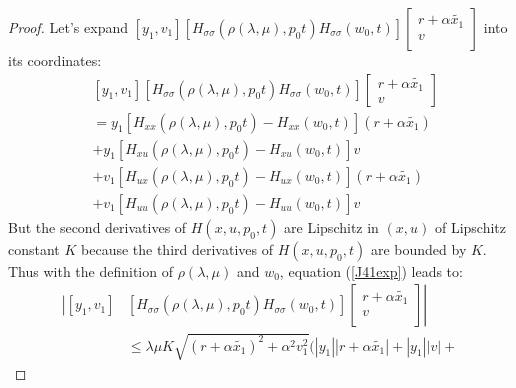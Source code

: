\documentclass[a4paper,10pt]{article}
\begin{document}
\begin{proof}
    Let's expand $\left[y_{1},v_{1}\right]
	[H_{\sigma \sigma}(\rho(\lambda,\mu),p_{0}t)H_{\sigma \sigma}(w_{0},t)]
            \left[
        \begin{array}
        {c}
            r+\alpha\tilde{x_{1}}  \\
            v  \\
        \end{array}
        \right]$ 
	into its coordinates:
	\begin{equation}
		\begin{split}
	    & \left[y_{1},v_{1}\right]
	[H_{\sigma \sigma}(\rho(\lambda,\mu),p_{0}t)H_{\sigma \sigma}(w_{0},t)]
        \left[
        \begin{array}
        {c}
            r+\alpha\tilde{x_{1}}  \\
            v  
        \end{array}
        \right] \\ & =  
	y_{1}[H_{xx}(\rho(\lambda,\mu),p_{0}t)-H_{xx}(w_{0},t)](r+\alpha\tilde{x_{1}})
           \\
             & + y_{1}[H_{xu}(\rho(\lambda,\mu),p_{0}t)-H_{xu}(w_{0},t)]v
           \label{J41exp}\\
             & + v_{1}[H_{ux}(\rho(\lambda,\mu),p_{0}t)-H_{ux}(w_{0},t)](r+\alpha\tilde{x_{1}})
           \\
             & + 
	    v_{1}[H_{uu}(\rho(\lambda,\mu),p_{0}t)-H_{uu}(w_{0},t)]v
		   \end{split}
       \end{equation}
       But the second derivatives of $H(x,u,p_{0},t)$ are Lipschitz in 
       $(x,u)$ of 
       Lipschitz constant $K$ because the third derivatives of 
       $H(x,u,p_{0},t)$ are bounded by $K$.
       Thus with the definition of $\rho(\lambda,\mu)$ and $w_{0}$, 
       equation (\ref{J41exp}) leads to:
       \begin{align*}
           \left|\left[y_{1},v_{1}\right]
	   \right. & \left.
	[H_{\sigma \sigma}(\rho(\lambda,\mu),p_{0}t)H_{\sigma \sigma}(w_{0},t)]
        \left[
        \begin{array}
        {c}
            r+\alpha\tilde{x_{1}}  \\
            v  \\
        \end{array}
        \right] \right|  \\
	&\leq 
	\lambda\mu K \sqrt{(r+\alpha\tilde{x_{1}})^{2} + \alpha^{2}v_{1}^{2}}
	(|y_{1}||r+\alpha\tilde{x_{1}}| + |y_{1}||v| + 

\end{align*}
\end{proof}
\end{document}
